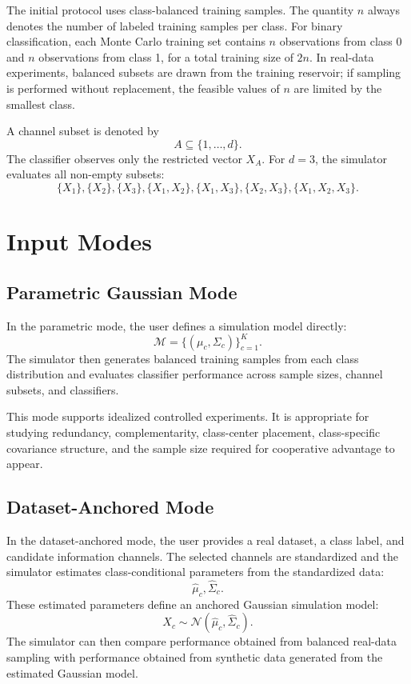 \documentclass[11pt,a4paper]{article}
\begin{document}
The initial protocol uses class-balanced training samples. The quantity $n$ always denotes the number of labeled training samples per class. For binary classification, each Monte Carlo training set contains $n$ observations from class 0 and $n$ observations from class 1, for a total training size of $2n$. In real-data experiments, balanced subsets are drawn from the training reservoir; if sampling is performed without replacement, the feasible values of $n$ are limited by the smallest class.

A channel subset is denoted by
\[
    A\subseteq\{1,\ldots,d\}.
\]
The classifier observes only the restricted vector $X_A$. For $d=3$, the simulator evaluates all non-empty subsets:
\[
\{X_1\},\{X_2\},\{X_3\},
\{X_1,X_2\},\{X_1,X_3\},\{X_2,X_3\},
\{X_1,X_2,X_3\}.
\]

\section{Input Modes}

\subsection{Parametric Gaussian Mode}

In the parametric mode, the user defines a simulation model directly:
\[
    \mathcal{M}=\{(\mu_c,\Sigma_c)\}_{c=1}^{K}.
\]
The simulator then generates balanced training samples from each class distribution and evaluates classifier performance across sample sizes, channel subsets, and classifiers.

This mode supports idealized controlled experiments. It is appropriate for studying redundancy, complementarity, class-center placement, class-specific covariance structure, and the sample size required for cooperative advantage to appear.

\subsection{Dataset-Anchored Mode}

In the dataset-anchored mode, the user provides a real dataset, a class label, and candidate information channels. The selected channels are standardized and the simulator estimates class-conditional parameters from the standardized data:
\[
    \hat{\mu}_c,\hat{\Sigma}_c.
\]
These estimated parameters define an anchored Gaussian simulation model:
\[
    X_c \sim \mathcal{N}(\hat{\mu}_c,\hat{\Sigma}_c).
\]
The simulator can then compare performance obtained from balanced real-data sampling with performance obtained from synthetic data generated from the estimated Gaussian model.
\end{document}
